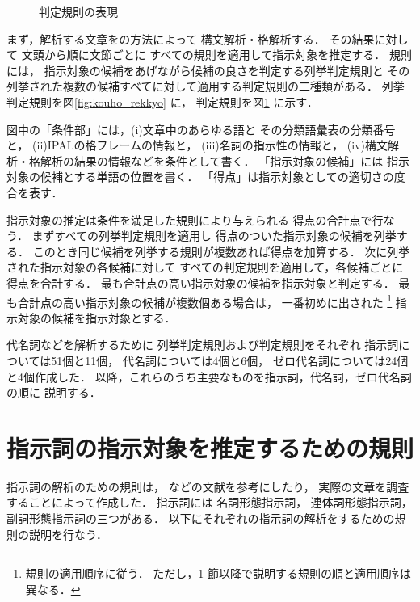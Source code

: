 \begin{figure}[t]
  \begin{center}
    \caption{判定規則の表現}
    \label{fig:kouho_hantei}
  \end{center}
\end{figure}

まず，解析する文章を\cite{csan2_ieice}の方法によって
構文解析・格解析する．
その結果に対して
文頭から順に文節ごとに
すべての規則を適用して指示対象を推定する．
規則には，
指示対象の候補をあげながら候補の良さを判定する列挙判定規則と
その列挙された複数の候補すべてに対して適用する判定規則の二種類がある．
列挙判定規則を図\ref{fig:kouho_rekkyo} に，
判定規則を図\ref{fig:kouho_hantei} に示す．

図中の「条件部」には，(i)文章中のあらゆる語と
その分類語彙表\cite{bgh}の分類番号と，
(ii)IPALの格フレーム\cite{ipal}の情報と，
(iii)名詞の指示性の情報と，
(iv)構文解析・格解析の結果の情報などを条件として書く．
「指示対象の候補」には
指示対象の候補とする単語の位置を書く．
「得点」は指示対象としての適切さの度合を表す．

指示対象の推定は条件を満足した規則により与えられる
得点の合計点で行なう．
まずすべての列挙判定規則を適用し
得点のついた指示対象の候補を列挙する．
このとき同じ候補を列挙する規則が複数あれば得点を加算する．
次に列挙された指示対象の各候補に対して
すべての判定規則を適用して，各候補ごとに得点を合計する．
最も合計点の高い指示対象の候補を指示対象と判定する．
最も合計点の高い指示対象の候補が複数個ある場合は，
一番初めに出された
\footnote{
規則の適用順序に従う．
ただし，\ref{sec:sijisi_ana} 節以降で説明する規則の順と適用順序は異なる．
}
指示対象の候補を指示対象とする．

代名詞などを解析するために
列挙判定規則および判定規則をそれぞれ
指示詞については51個と11個，
代名詞については4個と6個，
ゼロ代名詞については24個と4個作成した．
以降，これらのうち主要なものを指示詞，代名詞，ゼロ代名詞の順に
説明する．

\section{指示詞の指示対象を推定するための規則}
\label{sec:sijisi_ana}

指示詞の解析のための規則は，
\cite{seiho1}\cite{hyasi2}\cite{sijisi_nihongogaku}\cite{sijisi}
などの文献を参考にしたり，
実際の文章を調査することによって作成した．
指示詞には
名詞形態指示詞，
連体詞形態指示詞，
副詞形態指示詞の三つがある．
以下にそれぞれの指示詞の解析をするための規則の説明を行なう．

